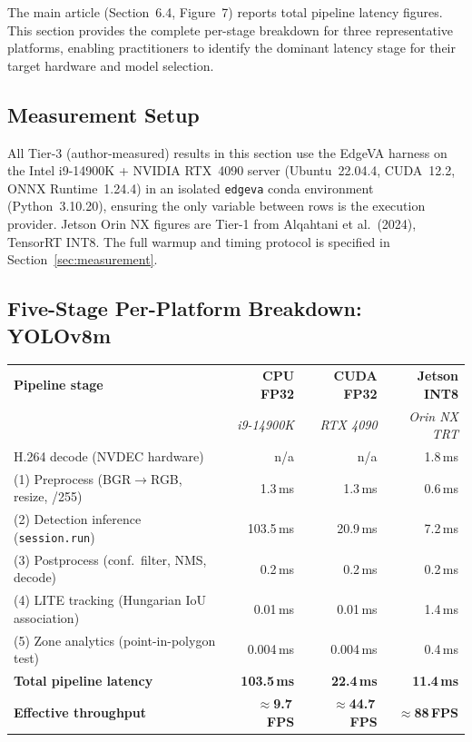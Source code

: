 \documentclass[11pt,a4paper]{article}
\begin{document}
\noindent The main article (Section~6.4, Figure~7) reports total
pipeline latency figures. This section provides the complete per-stage
breakdown for three representative platforms, enabling practitioners
to identify the dominant latency stage for their target hardware
and model selection.

\subsection{Measurement Setup}
\label{subsec:hw_config}

All Tier-3 (author-measured) results in this section use the EdgeVA
harness on the Intel i9-14900K + NVIDIA RTX~4090 server
(Ubuntu~22.04.4, CUDA~12.2, ONNX Runtime~1.24.4) in an isolated
\texttt{edgeva} conda environment (Python~3.10.20), ensuring the
only variable between rows is the execution provider. Jetson Orin NX
figures are Tier-1 from Alqahtani et al.\ (2024), TensorRT INT8.
The full warmup and timing protocol is specified in
Section~\ref{sec:measurement}.

\subsection{Five-Stage Per-Platform Breakdown: YOLOv8m}

\begin{center}
\begin{tabular}{lrrr}
  \toprule
  \textbf{Pipeline stage} &
    \textbf{CPU FP32} &
    \textbf{CUDA FP32} &
    \textbf{Jetson INT8} \\
  & \textit{i9-14900K} & \textit{RTX 4090} & \textit{Orin NX TRT} \\
  \midrule
  H.264 decode (NVDEC hardware) & n/a & n/a & 1.8\,ms \\
  (1) Preprocess (BGR$\to$RGB, resize, /255) & 1.3\,ms & 1.3\,ms & 0.6\,ms \\
  (2) Detection inference (\texttt{session.run}) & 103.5\,ms & 20.9\,ms & 7.2\,ms \\
  (3) Postprocess (conf.\ filter, NMS, decode) & 0.2\,ms & 0.2\,ms & 0.2\,ms \\
  (4) LITE tracking (Hungarian IoU association) & 0.01\,ms & 0.01\,ms & 1.4\,ms \\
  (5) Zone analytics (point-in-polygon test) & 0.004\,ms & 0.004\,ms & 0.4\,ms \\
  \midrule
  \textbf{Total pipeline latency} &
    \textbf{103.5\,ms} & \textbf{22.4\,ms} & \textbf{11.4\,ms} \\
  \textbf{Effective throughput} &
    $\approx$\textbf{9.7\,FPS} & $\approx$\textbf{44.7\,FPS} & $\approx$\textbf{88\,FPS} \\
  \bottomrule
\end{tabular}
\end{center}
\end{document}
